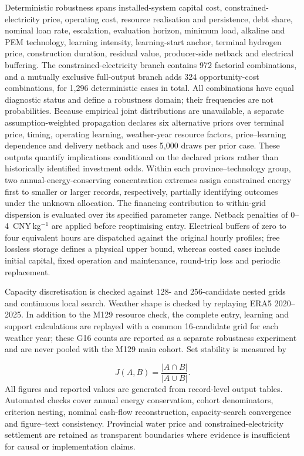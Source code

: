 \documentclass[lineno,pdflatex,sn-nature]{sn-jnl}
\newcommand{\cnykg}{CNY\,kg$^{-1}$}
\begin{document}
Deterministic robustness spans installed-system capital cost, constrained-electricity price, operating cost, resource realisation and persistence, debt share, nominal loan rate, escalation, evaluation horizon, minimum load, alkaline and PEM technology, learning intensity, learning-start anchor, terminal hydrogen price, construction duration, residual value, producer-side netback and electrical buffering. The constrained-electricity branch contains 972 factorial combinations, and a mutually exclusive full-output branch adds 324 opportunity-cost combinations, for 1,296 deterministic cases in total. All combinations have equal diagnostic status and define a robustness domain; their frequencies are not probabilities. Because empirical joint distributions are unavailable, a separate assumption-weighted propagation declares six alternative priors over terminal price, timing, operating learning, weather-year resource factors, price--learning dependence and delivery netback and uses 5,000 draws per prior case. These outputs quantify implications conditional on the declared priors rather than historically identified investment odds. Within each province--technology group, two annual-energy-conserving concentration extremes assign constrained energy first to smaller or larger records, respectively, partially identifying outcomes under the unknown allocation. The financing contribution to within-grid dispersion is evaluated over its specified parameter range. Netback penalties of 0--4~\cnykg{} are applied before reoptimising entry. Electrical buffers of zero to four equivalent hours are dispatched against the original hourly profiles; free lossless storage defines a physical upper bound, whereas costed cases include initial capital, fixed operation and maintenance, round-trip loss and periodic replacement.

Capacity discretisation is checked against 128- and 256-candidate nested grids and continuous local search. Weather shape is checked by replaying ERA5 2020--2025. In addition to the M129 resource check, the complete entry, learning and support calculations are replayed with a common 16-candidate grid for each weather year; these G16 counts are reported as a separate robustness experiment and are never pooled with the M129 main cohort. Set stability is measured by

\begin{equation}
J(A,B)=\frac{|A\cap B|}{|A\cup B|}.
\label{eq:jaccard}
\end{equation}
All figures and reported values are generated from record-level output tables. Automated checks cover annual energy conservation, cohort denominators, criterion nesting, nominal cash-flow reconstruction, capacity-search convergence and figure--text consistency. Provincial water price and constrained-electricity settlement are retained as transparent boundaries where evidence is insufficient for causal or implementation claims.
\end{document}
